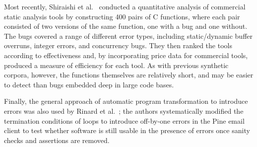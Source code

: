Most recently, Shiraishi et al.~\cite{Shiraishi:2014} conducted a quantitative analysis of commercial static analysis tools by constructing 400 pairs of C functions, where each pair consisted of two versions of the same function, one with a bug and one without. The bugs covered a range of different error types, including static/dynamic buffer overruns, integer errors, and concurrency bugs. They then ranked the tools according to effectiveness and, by incorporating price data for commercial tools, produced a measure of efficiency for each tool. As with previous synthetic corpora, however, the functions themselves are relatively short, and may be easier to detect than bugs embedded deep in large code bases.

Finally, the general approach of automatic program transformation to introduce errors was also used by Rinard et al.~\cite{Rinard:2005}; the authors systematically modified the termination conditions of loops to introduce off-by-one errors in the Pine email client to test whether software is still usable in the presence of errors once sanity checks and assertions are removed.
